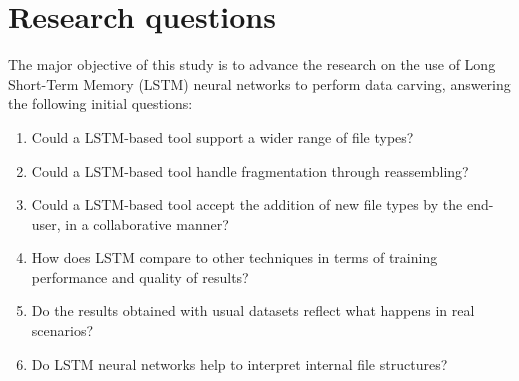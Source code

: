 \section{Research questions}

The major objective of this study is to advance the research on the use of Long Short-Term Memory (LSTM) neural networks to perform data carving, answering the following initial questions:

\begin{enumerate}[itemindent=\parindent,label=\textbf{Q\arabic*.}]

    \item Could a LSTM-based tool support a wider range of file types?
    
    \item Could a LSTM-based tool handle fragmentation through reassembling?
    
    \item Could a LSTM-based tool accept the addition of new file types by the end-user, in a collaborative manner? 

    \item How does LSTM compare to other techniques in terms of training performance and quality of results?
    
    \item Do the results obtained with usual datasets reflect what happens in real scenarios?

    \item Do LSTM neural networks help to interpret internal file structures?

\end{enumerate}
